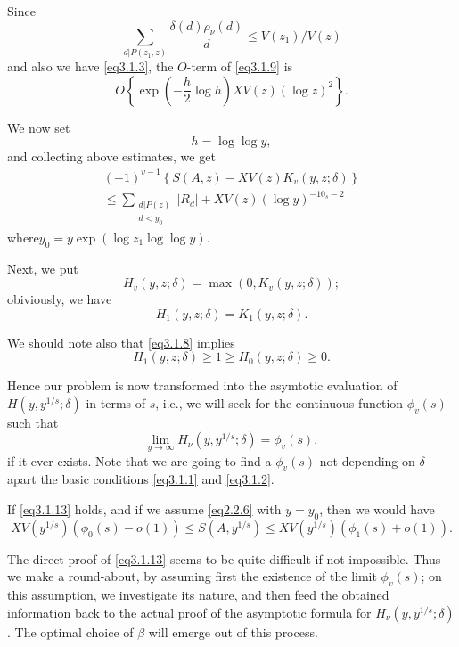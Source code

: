 Since
$$
\sum_{d|P(z_1,z)} \frac{\delta (d) \rho_\nu (d)}{d} \le V(z_1)/V(z)
$$
and also we have \eqref{eq3.1.3}, the $O$-term of \eqref{eq3.1.9} is
$$
O\left\{ \exp \left(- \frac{h}{2} \log h\right) XV (z)(\log z)^2 \right\}.
$$

We now set
$$
h= \log \log y,
$$
and collecting above estimates, we get
\begin{multline*}
  (-1)^{v-1} \left\{ S(A,z)- XV(z) K_v(y,z; \delta) \right\}\\
  \le \sum_{\substack{d|P(z)\\d <y_0}}|R_d|+XV (z) (\log y)^{-10_s -2}
  \tag{3.1.11}\label{eq3.1.11} 
\end{multline*}
where\pageoriginale $y_0=y \exp (\log z_1 \log \log y)$.

Next, we put
$$
H_v(y,z;\delta)= \max (0,K_v(y,z; \delta));
$$
obiviously, we have
$$
H_1(y,z; \delta)= K_1 (y,z; \delta).
$$

We should note also that \eqref{eq3.1.8} implies
\begin{equation*}
  H_1 (y,z; \delta)\ge 1 \ge H_0(y,z; \delta) \ge
  0. \tag{3.1.12}\label{eq3.1.12} 
\end{equation*}

Hence our problem is now transformed into the asymtotic evaluation of
$H(y,y^{1/s };\delta)$ in terms of $s$, i.e., we will seek for the
continuous function $\phi _v (s)$ such that  
\begin{equation*}
\lim _{y \to \infty}H_\nu(y,y^{1/s} ;\delta)= \phi_v (s),
\tag{3.1.13}\label{eq3.1.13} 
\end{equation*}
if it ever exists. Note that we are going to find a $\phi _v(s)$ not
depending on $\delta$ apart the basic conditions \eqref{eq3.1.1} and
\eqref{eq3.1.2}. 

If \eqref{eq3.1.13} holds, and if we assume \eqref{eq2.2.6} with
$y=y_0$, then we would have 
\begin{equation*}
  XV(y^{1/s})(\phi_0 (s)-o (1)) \le S(A,y^{1/s}) \le XV(y^{1/s})
  (\phi_1 (s)+o (1)). \tag{3.1.14}  \label{eq3.1.14}
\end{equation*}

The direct proof of \eqref{eq3.1.13} seems to be quite difficult if not
impossible. Thus we make a round-about, by assuming first the
existence of the limit $\phi_v(s)$; on this assumption, we investigate
its nature, and then feed the obtained information back to the actual
proof of the asymptotic formula for $H_\nu(y,y^{1/s}; \delta)$. The
optimal choice of $\beta$ will emerge out of this process. 

